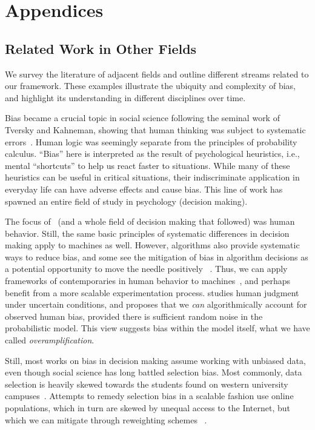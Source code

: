 \appendix

\section{Appendices}
\label{sec:appendix}

\subsection{Related Work in Other Fields}
\label{app:sec:relatedWork}
We survey the literature of adjacent fields and outline different streams related to our framework. These examples illustrate the ubiquity and complexity of bias, and highlight its understanding in different disciplines over time.

Bias became a crucial topic in social science following the seminal work of Tversky and Kahneman, showing that human thinking was subject to systematic errors~\cite{tversky1973availability}. Human logic was seemingly separate from the principles of probability calculus. ``Bias'' here is interpreted as the result of psychological heuristics, i.e., mental ``shortcuts'' to help us react faster to situations. 
While many of these heuristics can be useful in critical situations, their indiscriminate application in everyday life can have adverse effects and cause bias. 
This line of work has spawned an entire field of study in psychology (decision making). 

The focus of~ (and a whole field of decision making that followed) was human behavior. Still, the same basic principles of systematic differences in decision making apply to machines as well. 
However, algorithms also provide systematic ways to reduce bias, and some see the mitigation of bias in algorithm decisions as a potential opportunity to move the needle positively ~\cite{kleinberg2018discrimination}.
Thus, we can apply frameworks of contemporaries in human behavior to machines~\cite{rahwan2019machine}, and perhaps benefit from a more scalable experimentation process.  studies human judgment under uncertain conditions, and proposes that we \textit{can} algorithmically account for observed human bias, provided there is sufficient random noise in the probabilistic model.
This view suggests bias within the model itself, what we have called \textit{overamplification}.

Still, most works on bias in decision making assume working with unbiased data, even though social science has long battled selection bias. 
Most commonly, data selection is heavily skewed towards the students found on western university campuses~\cite{henrich2010weirdest}. 
Attempts to remedy selection bias in a scalable fashion use online populations, which in turn are skewed by unequal access to the Internet, but which we can mitigate through reweighting schemes ~\cite{couper2013sky}.

